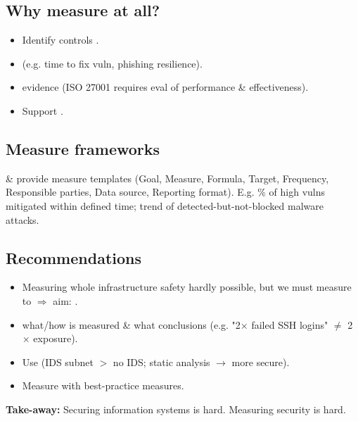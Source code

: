 \subsection{Why measure at all?}
\begin{itemize}
\item Identify controls .
\item {} (e.g. time to fix vuln, phishing resilience).
\item {} evidence (ISO 27001 requires eval of performance \& effectiveness).
\item Support .
\end{itemize}

\subsection{Measure frameworks}
 \&  provide measure templates (Goal, Measure, Formula, Target, Frequency, Responsible parties, Data source, Reporting format). E.g. \% of high vulns mitigated within defined time; trend of detected-but-not-blocked malware attacks.

\subsection{Recommendations}
\begin{itemize}
\item Measuring whole infrastructure safety hardly possible, but we must measure to  $\Rightarrow$ aim: .
\item {} what/how is measured \& what conclusions (e.g. "2$\times$ failed SSH logins" $\neq$ 2$\times$ exposure).
\item Use  (IDS subnet $>$ no IDS; static analysis $\to$ more secure).
\item Measure  with best-practice measures.
\end{itemize}

\begin{defbox}
\textbf{Take-away:} Securing information systems is hard. Measuring security is hard.
\end{defbox}


